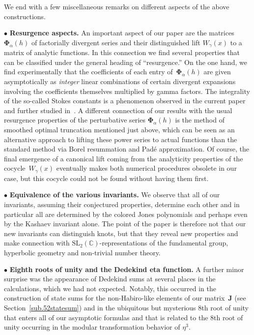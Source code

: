 \documentclass[pdftex]{sigma}
\numberwithin{equation}{section}
\def\BC{\mathbb C}
\def\SL{\mathrm{SL}}
\def\a{\alpha}
\def\a{\alpha}
\def\g{\gamma}
\def\bJ{J} \def\bJ{\mathbf{J}}
\def\bPhi{\mathbf\Phi}
\begin{document}
We end with a few miscellaneous remarks on different aspects of the above constructions.

$\bullet$ {\bf Resurgence aspects.}
An important aspect of our paper are the matrices $\bPhi_\a(h)$ of factorially divergent
series and their distinguished lift $W_\g(x)$ to a matrix of analytic functions.
In this connection we find several properties that can be classified under the general
heading of ``resurgence.'' On the one hand, we find experimentally that the
coefficients of each entry of~$\bPhi_\a(h)$ are given asymptotically as \emph{integer}
linear combinations of certain divergent expansions involving the coefficients themselves
multiplied by gamma factors. The integrality of the so-called Stokes constants is a
phenomenon observed in the current paper and further studied in~\cite{GGM,GGM:peacock}.
A different connection of our results with the usual resurgence properties of the
perturbative series $\bPhi_\a(h)$ is the method of smoothed optimal truncation
mentioned just above, which can be seen as an alternative approach to lifting these
power series to actual functions than the standard method via Borel resummation and
Pad\'e approximation. Of course, the final emergence of a canonical lift coming from
the analyticity properties of the cocycle~$W_\g(x)$ eventually makes both numerical
procedures obsolete in our case, but this cocycle could not be found without having
them first.

$\bullet$ {\bf Equivalence of the various invariants.}
We observe that all of our invariants, assuming their conjectured properties, determine
each other and in particular all are determined by the colored Jones polynomials
and perhaps even by the Kashaev invariant alone. The point of the paper is therefore
not that our new invariants can distinguish knots, but that they reveal new properties
and make connection with $\SL_2(\BC)$-representations of the
fundamental group, hyperbolic geometry and non-trivial number theory.

$\bullet$ {\bf Eighth roots of unity and the Dedekind eta function.}
A further minor surprise was the appearance of Dedekind sums
at several places in the calculations, which we had not expected.
Notably, this occurred in the construction of state sums
for the non-Habiro-like elements of our matrix~$\bJ$ (see Section~\ref{sub.52statesum})
and in the ubiquitous but mysterious 8th root of unity that enters
all of our asymptotic formulas and that is related to the 8th root
of unity occurring in the modular transformation behavior of $\eta^3$.
\end{document}
